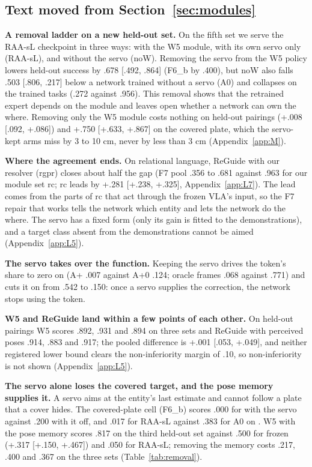 \subsection{Text moved from Section~\ref{sec:modules}}
\label{app:M4}

\textbf{A removal ladder on a new held-out set.} On the fifth set we serve the RAA-sL checkpoint in three ways: with the W5 module, with its own servo only (RAA-sL), and without the servo (noW). Removing the servo from the W5 policy lowers held-out success by .678 [.492, .864] (F6\_b by .400), but noW also falls \mi.503 [\mi.806, \mi.217] below a network trained without a servo (A0) and collapses on the trained tasks (.272 against .956). This removal shows that the retrained expert depends on the module and leaves open whether a network can own the where. Removing only the W5 module costs nothing on held-out pairings (+.008 [\mi.092, +.086]) and +.750 [+.633, +.867] on the covered plate, which the servo-kept arms miss by 3 to 10 cm, never by less than 3 cm (Appendix~\ref{app:M}).

\textbf{Where the agreement ends.} On relational language, ReGuide with our resolver (rgpr) closes about half the gap (F7 pool .356 to .681 against .963 for our module set rc; rc leads by +.281 [+.238, +.325], Appendix~\ref{app:L7}). The lead comes from the parts of rc that act through the frozen VLA's input, so the F7 repair that works tells the network which entity and lets the network do the where. The servo has a fixed form (only its gain is fitted to the demonstrations), and a target class absent from the demonstrations cannot be aimed (Appendix~\ref{app:L5}).

\textbf{The servo takes over the function.} Keeping the servo drives the token's share to zero on \pifive{} (A+ \mi.007 against A+0 .124; oracle frames \mi.068 against .771) and cuts it on \pizero{} from .542 to \mi.150: once a servo supplies the correction, the network stops using the token.

\textbf{W5 and ReGuide land within a few points of each other.} On held-out pairings W5 scores .892, .931 and .894 on three sets and ReGuide with perceived poses .914, .883 and .917; the pooled difference is +.001 [\mi.053, +.049], and neither registered lower bound clears the non-inferiority margin of \mi.10, so non-inferiority is not shown (Appendix~\ref{app:L5}).

\textbf{The servo alone loses the covered target, and the pose memory supplies it.} A servo aims at the entity's last estimate and cannot follow a plate that a cover hides. The covered-plate cell (F6\_b) scores .000 for \pizero{} with the servo against .200 with it off, and .017 for RAA-sL against .383 for A0 on \pifive. W5 with the pose memory scores .817 on the third held-out set against .500 for frozen \pifive{} (+.317 [+.150, +.467]) and .050 for RAA-sL; removing the memory costs .217, .400 and .367 on the three sets (Table~\ref{tab:removal}).

